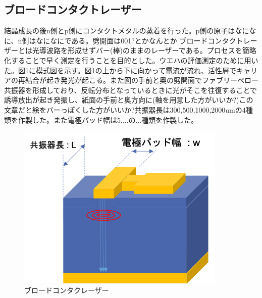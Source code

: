 \newpage
\subsection{ブロードコンタクトレーザー}%
結晶成長の後n側とp側にコンタクトメタルの蒸着を行った。p側の原子はなになに、n側はなになにである。劈開面は001?とかなんとか
ブロードコンタクトレーザーとは光導波路を形成せずバー(棒)のままのレーザーである。プロセスを簡略化することで早く測定を行うことを目的とした。ウエハの評価測定のために用いた。図\ref{fig:sample_broadcontact}に模式図を示す。図\ref{fig:sample_broadcontact}の上から下に向かって電流が流れ、活性層でキャリアの再結合が起き発光が起こる。また図の手前と奥の劈開面でファブリーペロー共振器を形成しており、反転分布となっているときに光がそこを往復することで誘導放出が起き発振し、紙面の手前と奥方向に(軸を用意した方がいいか?)この文章だと絵をバーっぽくした方がいいか?共振器長は300,500,1000,2000umの4種類を作製した。また電極パッド幅は5,...の...種類を作製した。

\begin{figure}[t]
	\centering
	\includegraphics[width=10cm]{figure/fig_broadcontact.png}
	\caption{ブロードコンタクレーザー}
	\label{fig:sample_broadcontact}
\end{figure}

